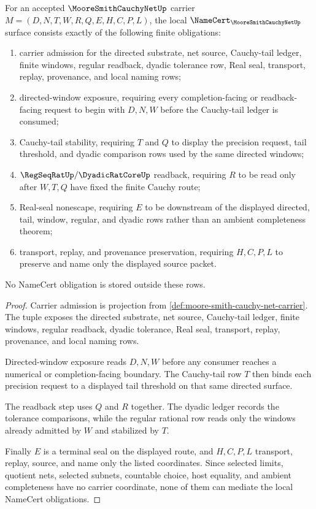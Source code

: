 \begin{theorem}
\label{thm:moore-smith-cauchy-net-namecert-obligations}
For an accepted $\MooreSmithCauchyNetUp$ carrier $M=(D,N,T,W,R,Q,E,H,C,P,L)$, the local $\NameCert_{\MooreSmithCauchyNetUp}$ surface consists exactly of the following finite obligations:
\begin{enumerate}
\item carrier admission for the directed substrate, net source, Cauchy-tail ledger, finite windows, regular readback, dyadic tolerance row, Real seal, transport, replay, provenance, and local naming rows;
\item directed-window exposure, requiring every completion-facing or readback-facing request to begin with $D,N,W$ before the Cauchy-tail ledger is consumed;
\item Cauchy-tail stability, requiring $T$ and $Q$ to display the precision request, tail threshold, and dyadic comparison rows used by the same directed windows;
\item $\RegSeqRatUp/\DyadicRatCoreUp$ readback, requiring $R$ to be read only after $W,T,Q$ have fixed the finite Cauchy route;
\item Real-seal nonescape, requiring $E$ to be downstream of the displayed directed, tail, window, regular, and dyadic rows rather than an ambient completeness theorem;
\item transport, replay, and provenance preservation, requiring $H,C,P,L$ to preserve and name only the displayed source packet.
\end{enumerate}
No NameCert obligation is stored outside these rows.
\end{theorem}
\begin{proof}
Carrier admission is projection from \autoref{def:moore-smith-cauchy-net-carrier}. The tuple exposes the directed substrate, net source, Cauchy-tail ledger, finite windows, regular readback, dyadic tolerance, Real seal, transport, replay, provenance, and local naming rows.

Directed-window exposure reads $D,N,W$ before any consumer reaches a numerical or completion-facing boundary. The Cauchy-tail row $T$ then binds each precision request to a displayed tail threshold on that same directed surface.

The readback step uses $Q$ and $R$ together. The dyadic ledger records the tolerance comparisons, while the regular rational row reads only the windows already admitted by $W$ and stabilized by $T$.

Finally $E$ is a terminal seal on the displayed route, and $H,C,P,L$ transport, replay, source, and name only the listed coordinates. Since selected limits, quotient nets, selected subnets, countable choice, host equality, and ambient completeness have no carrier coordinate, none of them can mediate the local NameCert obligations.
\end{proof}


